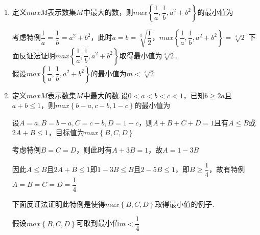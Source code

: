 \begin{enumerate}
    \item 定义$max M$表示数集$M$中最大的数，则$max\left\{\dfrac{1}{a}, \dfrac{1}{b}, a^2+b^2\right\}$的最小值为
    \begin{jieda}
        考虑特例$\dfrac{1}{a} = \dfrac{1}{b} = a^2+b^2$，此时$a = b = \sqrt[3]{\dfrac{1}{2}}$，$max\left\{\dfrac{1}{a}, \dfrac{1}{b}, a^2+b^2\right\} = \sqrt[3]{2}$ 下面反证法证明$max\left\{\dfrac{1}{a}, \dfrac{1}{b}, a^2+b^2\right\}$取得最小值为$\sqrt[3]{2}$. \\
        假设$max\left\{\dfrac{1}{a}, \dfrac{1}{b}, a^2+b^2\right\}$的最小值为$m < \sqrt[3]{2}$
    \end{jieda}
    \item 定义$max M$表示数集$M$中最大的数.设$0<a<b<c<1$，已知$b\geq 2a$且$a+b\leq 1$，则$max\left\{b-a, c-b, 1-c\right\}$的最小值为
    \begin{jieda}
        设$A = a, B = b-a, C = c - b, D = 1 - c$，则$A+B+C+D = 1$且有$A \leq B$或$2A+B \leq 1$，目标值为$max\left\{B, C, D\right\}$

        考虑特例$B = C = D$，则此时有$A+3B = 1$，故$A = 1-3B$
        
        因此$A \leq B$且$2A+B \leq 1$即$1-3B \leq B$且$2-5B \leq 1$，即$B \geq \dfrac{1}{4}$，故有特例$A = B = C = D = \dfrac{1}{4}$
        
        下面反证法证明此特例是使得$max\left\{B, C, D\right\}$取得最小值的例子.

        假设$max\left\{B, C, D\right\}$可取到最小值$m < \dfrac{1}{4}$
\end{jieda}
\end{enumerate}
